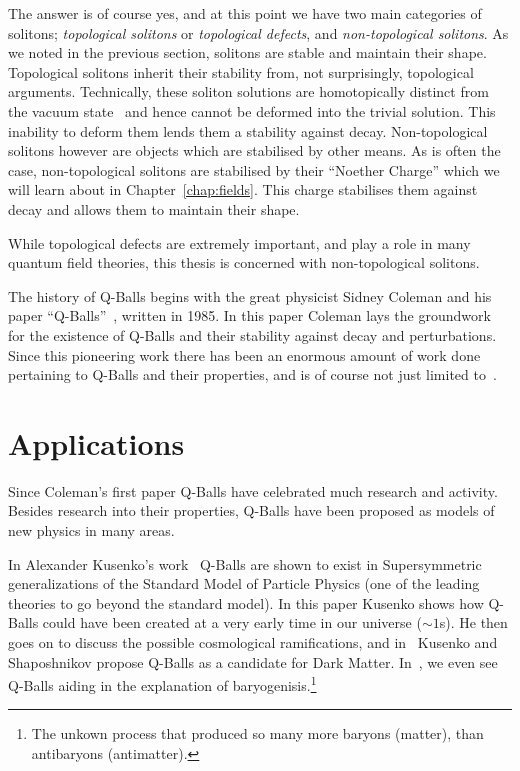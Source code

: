 The answer is of course yes, and at this point we have two main categories of
solitons; \textit{topological solitons} or \textit{topological defects}, and
\textit{non-topological solitons}. As we noted in the previous section,
solitons are stable and maintain their shape. Topological solitons inherit
their stability from, not surprisingly, topological arguments. Technically,
these soliton solutions are homotopically distinct from the vacuum
state~\cite{nakahara} and hence cannot be deformed into the trivial solution.
This inability to deform them lends them a stability against decay.
Non-topological solitons however are objects which are stabilised by other
means. As is often the case, non-topological solitons are stabilised by their
``Noether Charge'' which we will learn about in Chapter~\ref{chap:fields}. This
charge stabilises them against decay and allows them to maintain their shape.

While topological defects are extremely important, and play a role in many
quantum field theories, this thesis is concerned with non-topological solitons.

The history of Q-Balls begins with the great physicist Sidney Coleman and his
paper ``Q-Balls''~\cite{coleman}, written in 1985. In this paper Coleman lays
the groundwork for the existence of Q-Balls and their stability against decay
and perturbations. Since this pioneering work there has been an enormous amount
of work done pertaining to Q-Balls and their properties, and is of course not
just limited
to~\cite{qball1,qball2,qball3,qball4,qball5,qball6,qball7,qball8,qball9}.

\section{Applications}\label{sec:apps}
Since Coleman's first paper Q-Balls have celebrated much research and activity.
Besides research into their properties, Q-Balls have been proposed as models of
new physics in many areas.

In Alexander Kusenko's work~\cite{SUSY} Q-Balls are shown to exist in
Supersymmetric generalizations of the Standard Model of Particle Physics (one
of the leading theories to go beyond the standard model). In this paper Kusenko
shows how Q-Balls could have been created at a very early time in our universe
(\(\sim1\)s). He then goes on to discuss the possible cosmological ramifications,
and in~\cite{darkmatter} Kusenko and Shaposhnikov propose Q-Balls as a candidate
for Dark Matter. In~\cite{baryogen,baryogen2}, we even see Q-Balls aiding in
the explanation of baryogenisis.\footnote{The unkown process that produced so
    many more baryons (matter), than antibaryons (antimatter).}
